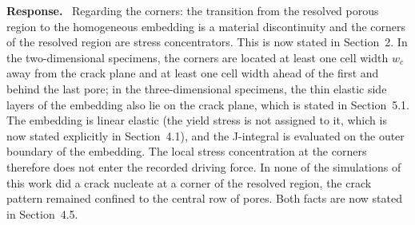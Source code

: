 \documentclass[pdflatex,sn-mathphys-num]{sn-jnl}
\newenvironment{response}
  {\par\noindent\textbf{Response.}\ }
  {\par}
\begin{document}
\begin{response}
Regarding the corners: the transition from the resolved porous region to the homogeneous embedding is a material discontinuity and the corners of the resolved region are stress concentrators. This is now stated in Section~2. In the two-dimensional specimens, the corners are located at least one cell width $w_c$ away from the crack plane and at least one cell width ahead of the first and behind the last pore; in the three-dimensional specimens, the thin elastic side layers of the embedding also lie on the crack plane, which is stated in Section~5.1. The embedding is linear elastic (the yield stress is not assigned to it, which is now stated explicitly in Section~4.1), and the J-integral is evaluated on the outer boundary of the embedding. The local stress concentration at the corners therefore does not enter the recorded driving force. In none of the simulations of this work did a crack nucleate at a corner of the resolved region, the crack pattern remained confined to the central row of pores. Both facts are now stated in Section~4.5.
\end{response}
\end{document}
